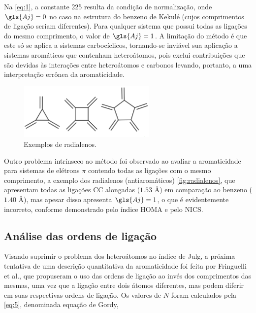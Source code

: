 Na \autoref{eq:1}, a constante 225 resulta da condição de normalização, onde $\gls{Aj} = 0$ no caso na estrutura do benzeno de Kekulé (cujos comprimentos de ligação seriam diferentes). Para qualquer sistema que possui todas as ligações do mesmo comprimento, o valor de $\gls{Aj} = 1$. A limitação do método é que este só se aplica a sistemas carbocíclicos, tornando-se inviável sua aplicação a sistemas aromáticos que contenham heteroátomos, pois exclui contribuições que são devidas às interações entre heteroátomos e carbonos levando, portanto, a uma interpretação errônea da aromaticidade.

\begin{figure}[htb]
	\caption{\label{fig:radialenos} Exemplos de radialenos.}
	\begin{center}
		\includegraphics[width=0.60\textwidth]{images/Screenshot from 2022-07-13 13-24-27.png}
	\end{center}
\end{figure}

Outro problema intrínseco ao método foi observado ao avaliar a aromaticidade para sistemas de elétrons $\pi$ contendo todas as ligações com o mesmo comprimento, a exemplo dos radialenos (antiaromáticos) \autoref{fig:radialenos}, que apresentam todas as ligações CC alongadas ($1.53$ \AA) em comparação ao benzeno ($1.40$ \AA), mas apesar disso apresenta $\gls{Aj} = 1$, o que é evidentemente incorreto, conforme demonstrado pelo índice \gls{HOMA} e pelo \gls{NICS}.

\subsection{Análise das ordens de ligação}

Visando suprimir o problema dos heteroátomos no índice de Julg, a próxima tentativa de uma descrição quantitativa da aromaticidade foi feita por Fringuelli et al.\autocite{Fringuelli1974}, que propuseram o uso das ordens de ligação ao invés dos comprimentos das mesmas, uma vez que a ligação entre dois átomos diferentes, mas podem diferir em suas respectivas ordens de ligação. Os valores de $N$ foram calculados pela \autoref{eq:5}, denominada equação de Gordy\autocite{Gordy1947},

